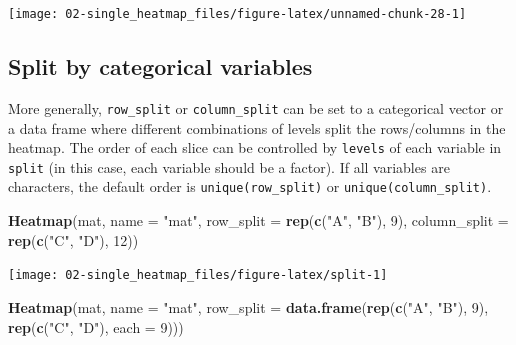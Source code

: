 \documentclass[]{book}
\newenvironment{Shaded}{\begin{snugshade}}{\end{snugshade}}
\newcommand{\KeywordTok}[1]{\textcolor[rgb]{0.13,0.29,0.53}{\textbf{#1}}}
\newcommand{\DataTypeTok}[1]{\textcolor[rgb]{0.13,0.29,0.53}{#1}}
\newcommand{\DecValTok}[1]{\textcolor[rgb]{0.00,0.00,0.81}{#1}}
\newcommand{\StringTok}[1]{\textcolor[rgb]{0.31,0.60,0.02}{#1}}
\newcommand{\NormalTok}[1]{#1}
\theoremstyle{definition}
\theoremstyle{definition}
\theoremstyle{definition}
\theoremstyle{remark}
\begin{document}
\begin{center}\texttt{[image: 02-single\_heatmap\_files/figure-latex/unnamed-chunk-28-1]} \end{center}

\subsection{Split by categorical
variables}\label{split-by-categorical-variables}

More generally, \texttt{row\_split} or \texttt{column\_split} can be set
to a categorical vector or a data frame where different combinations of
levels split the rows/columns in the heatmap. The order of each slice
can be controlled by \texttt{levels} of each variable in \texttt{split}
(in this case, each variable should be a factor). If all variables are
characters, the default order is \texttt{unique(row\_split)} or
\texttt{unique(column\_split)}.

\begin{Shaded}
\begin{Highlighting}[]
\KeywordTok{Heatmap}\NormalTok{(mat, }\DataTypeTok{name =} \StringTok{"mat"}\NormalTok{, }
    \DataTypeTok{row_split =} \KeywordTok{rep}\NormalTok{(}\KeywordTok{c}\NormalTok{(}\StringTok{"A"}\NormalTok{, }\StringTok{"B"}\NormalTok{), }\DecValTok{9}\NormalTok{), }\DataTypeTok{column_split =} \KeywordTok{rep}\NormalTok{(}\KeywordTok{c}\NormalTok{(}\StringTok{"C"}\NormalTok{, }\StringTok{"D"}\NormalTok{), }\DecValTok{12}\NormalTok{))}
\end{Highlighting}
\end{Shaded}

\begin{center}\texttt{[image: 02-single\_heatmap\_files/figure-latex/split-1]} \end{center}

\begin{Shaded}
\begin{Highlighting}[]
\KeywordTok{Heatmap}\NormalTok{(mat, }\DataTypeTok{name =} \StringTok{"mat"}\NormalTok{, }
    \DataTypeTok{row_split =} \KeywordTok{data.frame}\NormalTok{(}\KeywordTok{rep}\NormalTok{(}\KeywordTok{c}\NormalTok{(}\StringTok{"A"}\NormalTok{, }\StringTok{"B"}\NormalTok{), }\DecValTok{9}\NormalTok{), }\KeywordTok{rep}\NormalTok{(}\KeywordTok{c}\NormalTok{(}\StringTok{"C"}\NormalTok{, }\StringTok{"D"}\NormalTok{), }\DataTypeTok{each =} \DecValTok{9}\NormalTok{)))}
\end{Highlighting}
\end{Shaded}
\end{document}

